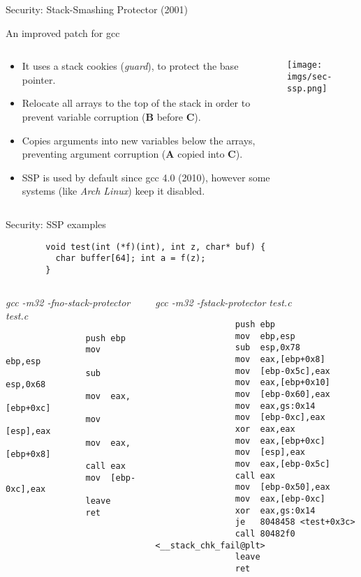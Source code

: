 \begin{frame}{Security: Stack-Smashing Protector (2001)}
	\begin{block}{An improved patch for gcc}
		\begin{columns}
			\begin{column}{.5\textwidth}
		\begin{itemize}
			\setlength{\leftmargini}{0pt}
			\item It uses a stack cookies (\emph{guard}), to protect the base pointer.
			\item Relocate all arrays to the top of the stack in order to prevent variable corruption (\textbf{B} before \textbf{C}).
			\item Copies arguments into new variables below the arrays, preventing argument corruption (\textbf{A} copied into \textbf{C}).
			\item SSP is used by default since gcc 4.0 (2010), however some systems (like \emph{Arch Linux}) keep it disabled.
		\end{itemize}
			\end{column}
			\begin{column}{.5\textwidth}
				\texttt{[image: imgs/sec-ssp.png]}
			\end{column}
		\end{columns}
	\end{block}
\end{frame}

\begin{frame}{Security: SSP examples}
	\ccode
	\begin{lstlisting}
		void test(int (*f)(int), int z, char* buf) {
		  char buffer[64]; int a = f(z);
		}
	\end{lstlisting}
	\vspace{-1cm}
	\begin{columns}[T]
		\begin{column}{.5\textwidth}
			{\small \emph{\alert{gcc -m32 -fno-stack-protector test.c}}}
			\acodesmall
			\begin{lstlisting}
				push ebp
				mov  ebp,esp
				sub  esp,0x68
				mov  eax,[ebp+0xc]
				mov  [esp],eax
				mov  eax,[ebp+0x8]
				call eax
				mov  [ebp-0xc],eax
				leave
				ret
			\end{lstlisting}
		\end{column}
		\begin{column}{.5\textwidth}
			{\small \emph{\alert{gcc -m32 -fstack-protector test.c}}}
			\acodesmall
			\begin{lstlisting}
				push ebp
				mov  ebp,esp
				sub  esp,0x78
				mov  eax,[ebp+0x8]
				mov  [ebp-0x5c],eax
				mov  eax,[ebp+0x10]
				mov  [ebp-0x60],eax
				mov  eax,gs:0x14
				mov  [ebp-0xc],eax
				xor  eax,eax
				mov  eax,[ebp+0xc]
				mov  [esp],eax
				mov  eax,[ebp-0x5c]
				call eax
				mov  [ebp-0x50],eax
				mov  eax,[ebp-0xc]
				xor  eax,gs:0x14
				je   8048458 <test+0x3c>
				call 80482f0 <__stack_chk_fail@plt>
				leave
				ret
			\end{lstlisting}
		\end{column}
	\end{columns}
\end{frame}

